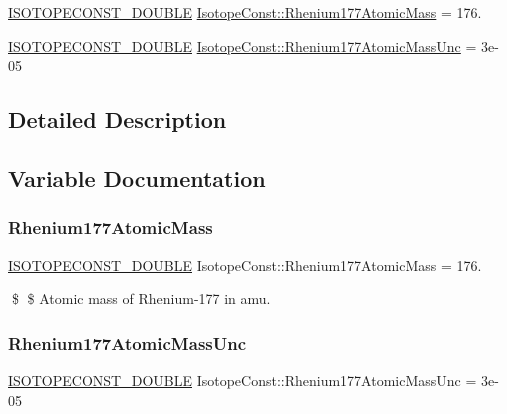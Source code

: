 \begin{DoxyCompactItemize}
\item 
\mbox{\hyperlink{group___isotope_const-_macros_ga8f45a7272ce02c0b4c65c44636ed719a}{I\+S\+O\+T\+O\+P\+E\+C\+O\+N\+S\+T\+\_\+\+D\+O\+U\+B\+LE}} \mbox{\hyperlink{group___isotope_const-_rhenium-_re177_gaf76cefb1f0858a3f75cf472e14e11bca}{Isotope\+Const\+::\+Rhenium177\+Atomic\+Mass}} = 176.
\item 
\mbox{\hyperlink{group___isotope_const-_macros_ga8f45a7272ce02c0b4c65c44636ed719a}{I\+S\+O\+T\+O\+P\+E\+C\+O\+N\+S\+T\+\_\+\+D\+O\+U\+B\+LE}} \mbox{\hyperlink{group___isotope_const-_rhenium-_re177_gabdd1d4d93cbfd50ed6eebb65f9c62bd5}{Isotope\+Const\+::\+Rhenium177\+Atomic\+Mass\+Unc}} = 3e-\/05
\end{DoxyCompactItemize}


\subsection{Detailed Description}


\subsection{Variable Documentation}
\mbox{\label{group___isotope_const-_rhenium-_re177_gaf76cefb1f0858a3f75cf472e14e11bca}} 
\subsubsection{\texorpdfstring{Rhenium177\+Atomic\+Mass}{Rhenium177AtomicMass}}
{\footnotesize\ttfamily \mbox{\hyperlink{group___isotope_const-_macros_ga8f45a7272ce02c0b4c65c44636ed719a}{I\+S\+O\+T\+O\+P\+E\+C\+O\+N\+S\+T\+\_\+\+D\+O\+U\+B\+LE}} Isotope\+Const\+::\+Rhenium177\+Atomic\+Mass = 176.}

\$ \$ Atomic mass of Rhenium-\/177 in amu. \mbox{\label{group___isotope_const-_rhenium-_re177_gabdd1d4d93cbfd50ed6eebb65f9c62bd5}} 
\subsubsection{\texorpdfstring{Rhenium177\+Atomic\+Mass\+Unc}{Rhenium177AtomicMassUnc}}
{\footnotesize\ttfamily \mbox{\hyperlink{group___isotope_const-_macros_ga8f45a7272ce02c0b4c65c44636ed719a}{I\+S\+O\+T\+O\+P\+E\+C\+O\+N\+S\+T\+\_\+\+D\+O\+U\+B\+LE}} Isotope\+Const\+::\+Rhenium177\+Atomic\+Mass\+Unc = 3e-\/05}

